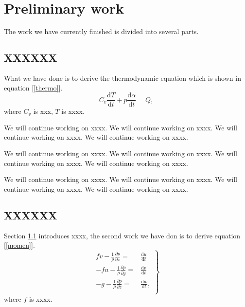 \documentclass[11pt]{article} %
\begin{document}
\section{Preliminary work}
The work we have currently finished is divided into several parts. \par
\subsection{XXXXXX}\label{sec:first_work}
What we have done is to derive the thermodynamic equation which is shown in equation [\ref{thermo}].
\begin{equation}\label{thermo} 
	C_v\frac{\mathrm{d} T}{\mathrm{d} t}+p\frac{\mathrm{d} \alpha }{\mathrm{d} t} =Q ,
\end{equation}
where $C_v$ is xxx, $T$ is xxxx. \par

We will continue working on xxxx. We will continue working on xxxx. We will continue working on xxxx. We will continue working on xxxx. \par
We will continue working on xxxx. We will continue working on xxxx. We will continue working on xxxx. We will continue working on xxxx. \par
We will continue working on xxxx. We will continue working on xxxx. We will continue working on xxxx. We will continue working on xxxx. \par

\subsection{XXXXXX}\label{sec:second_work}
Section \ref{sec:first_work} introduces xxxx, the second work we have don is to derive equation [\ref{momen}]. 
\begin{equation}\label{momen}
	\left. \begin{aligned}
		fv-\frac{1}{\rho}\frac{\partial p}{\partial x} = & \frac{\mathrm{d} u}{\mathrm{d} t}\\
		-fu-\frac{1}{\rho}\frac{\partial p}{\partial y} = &\frac{\mathrm{d} v}{\mathrm{d} t}\\
		-g-\frac{1}{\rho}\frac{\partial p}{\partial z} = &\frac{\mathrm{d} w}{\mathrm{d} t},\\
	\end{aligned}
	\right \}
\end{equation}
where $f$ is xxxx. \par
\end{document}

